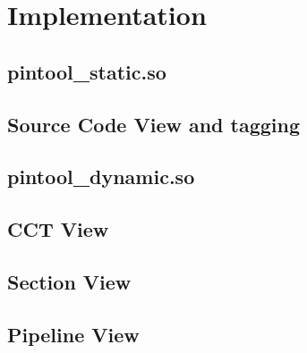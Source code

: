 \chapter{Implementation}

\section{pintool\_static.so}
\section{Source Code View and tagging}
\section{pintool\_dynamic.so}
\section{CCT View}
\section{Section View}
\section{Pipeline View}